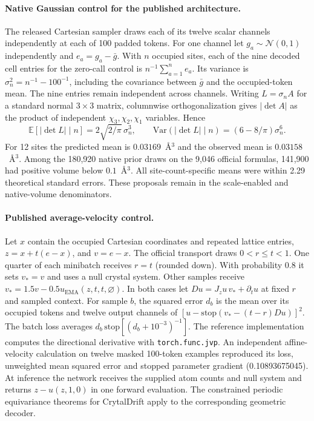 \paragraph{Native Gaussian control for the published architecture.}
The released Cartesian sampler draws each of its twelve scalar channels independently
at each of 100 padded tokens. For one channel let $g_a\sim\mathcal N(0,1)$ independently
and $e_a=g_a-\bar g$. With $n$ occupied sites, each of the nine decoded cell entries
for the zero-call control is $n^{-1}\sum_{a=1}^{n}e_a$. Its variance is
$\sigma_n^2=n^{-1}-100^{-1}$, including the covariance between $\bar g$
and the occupied-token mean. The nine entries remain independent across channels.
Writing $L=\sigma_n A$ for a standard normal $3\times3$ matrix, columnwise
orthogonalization gives $|\det A|$ as the product of independent $\chi_3,\chi_2,\chi_1$
variables. Hence
\[
 \mathbb E[|\det L|\mid n]=2\sqrt{2/\pi}\,\sigma_n^3,
 \qquad \mathrm{Var}(|\det L|\mid n)=(6-8/\pi)\sigma_n^6.
\]
For 12 sites the predicted mean is $0.03169$~\AA$^3$ and the observed mean is
$0.03158$~\AA$^3$. Among the 180,920 native prior draws on the 9,046 official
formulas, 141,900 had positive volume below $0.1$~\AA$^3$.
All site-count-specific means were within 2.29 theoretical standard errors.
These proposals remain in the scale-enabled and native-volume denominators.

\paragraph{Published average-velocity control.}
Let $x$ contain the occupied Cartesian coordinates and repeated lattice entries,
$z=x+t(e-x)$, and $v=e-x$. The official transport draws $0<r\le t<1$.
One quarter of each minibatch receives $r=t$ (rounded down).
With probability $0.8$ it sets $v_*=v$ and uses a null crystal system.
Other samples receive $v_*=1.5v-0.5u_{\mathrm{EMA}}(z,t,t,\varnothing)$.
In both cases let $D u=J_z u\,v_*+\partial_tu$ at fixed $r$ and sampled context.
For sample $b$, the squared error $d_b$ is the mean over its occupied tokens and
twelve output channels of
$[u-\mathrm{stop}(v_*-(t-r)Du)]^2$. The batch loss averages
$d_b\,\mathrm{stop}[(d_b+10^{-3})^{-1}]$. The reference implementation
computes the directional derivative with \texttt{torch.func.jvp}. An independent
affine-velocity calculation on twelve masked 100-token examples reproduced its loss,
unweighted mean squared error and stopped parameter gradient (0.10893675045).
At inference the network receives the supplied atom counts and null system and
returns $z-u(z,1,0)$ in one forward evaluation. The constrained periodic equivariance
theorems for CrytalDrift apply to the corresponding geometric decoder.

